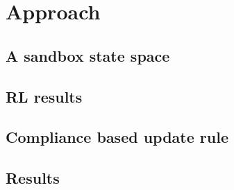 \documentclass[t]{beamer}
\begin{document}
\section{Approach}
{
	\subsection{A sandbox state space}
	{
		\frame[t]
		{
	
		}
	}
	\subsection{RL results}
	{
		\frame[t]
		{
	
		}
	}
	\subsection{Compliance based update rule}
	{
		\frame[t]
		{
	
		}
	}
	\subsection{Results}
	{
		\frame[t]
		{
	
		}
	}
}


%
\end{document}
